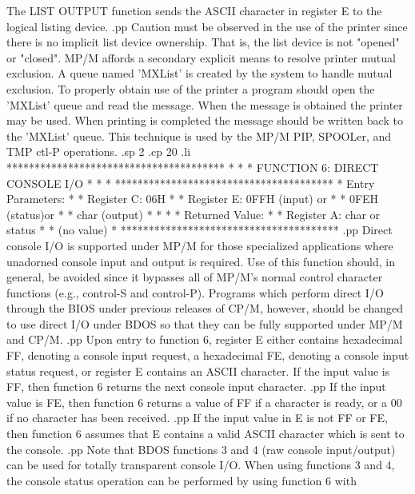 The LIST OUTPUT function sends the ASCII character in register
E to the logical listing device.
.pp
Caution  must be observed in the use of the  printer  since
there is no implicit list device ownership.  That is, the
list  device is not "opened" or "closed".  MP/M affords  a
secondary   explicit   means  to  resolve  printer   mutual
exclusion.  A queue named 'MXList' is created by the system
to handle mutual exclusion.  To properly obtain use  of the
printer  a program should open the 'MXList' queue and  read
the message.  When the message is obtained the printer may
be used.  When printing is completed the message should  be
written back to the 'MXList' queue.  This technique is used
by the MP/M PIP, SPOOLer, and TMP ctl-P operations.
.sp 2
.cp 20
.li
***************************************
*                                     *
*  FUNCTION 6:  DIRECT CONSOLE I/O    *
*                                     *
***************************************
*  Entry Parameters:                  *
*      Register   C:  06H             *
*      Register   E:  0FFH (input) or *
*                     0FEH (status)or *
*                     char (output)   *
*                                     *
*  Returned   Value:                  *
*      Register   A:  char or status  *
*                     (no value)      *
***************************************
.pp
Direct console I/O is supported under MP/M for those specialized
applications where unadorned console input and output is
required.  Use of this function should, in general, be avoided
since it bypasses all of MP/M's normal control character functions
(e.g., control-S and control-P).
Programs which perform direct I/O through the BIOS
under previous releases of CP/M, however,
should be changed to use direct I/O under BDOS so that they
can be fully supported under MP/M and CP/M.
.pp
Upon entry to function 6, register E either contains hexadecimal
FF, denoting a console input request, a hexadecimal FE, denoting
a console input status request, or register E contains
an ASCII character.  If the input value is FF, then function 6
returns the next console input character.
.pp
If the input value is FE, then function 6 returns a value of FF
if a character is ready, or a 00 if no character has been received.
.pp
If the input value in E is not FF or FE, then function 6 assumes that
E contains a valid ASCII character which is sent to the
console.
.pp
Note that BDOS functions 3 and 4 (raw console input/output) can be
used for totally transparent console I/O.  When using functions 3 and 4,
the console status operation can be performed by using function 6 with
